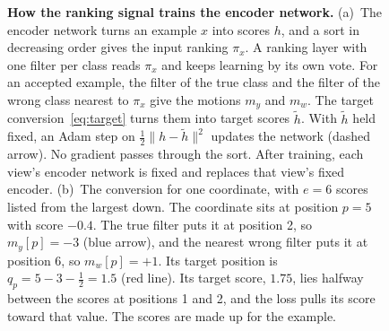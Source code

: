 \begin{figure}[!htbp]
{%
}
\caption{\textbf{How the ranking signal trains the encoder network.} (a)~The encoder network turns an example $x$ into scores $h$, and a sort in decreasing order gives the input ranking $\pi_x$. A ranking layer with one filter per class reads $\pi_x$ and keeps learning by its own vote. For an accepted example, the filter of the true class and the filter of the wrong class nearest to $\pi_x$ give the motions $m_y$ and $m_w$. The target conversion~\eqref{eq:target} turns them into target scores $\tilde h$. With $\tilde h$ held fixed, an Adam step on $\tfrac12\lVert h-\tilde h\rVert^2$ updates the network (dashed arrow). No gradient passes through the sort. After training, each view's encoder network is fixed and replaces that view's fixed encoder. (b)~The conversion for one coordinate, with $e=6$ scores listed from the largest down. The coordinate sits at position $p=5$ with score $-0.4$. The true filter puts it at position 2, so $m_y[p]=-3$ (blue arrow), and the nearest wrong filter puts it at position 6, so $m_w[p]=+1$. Its target position is $q_p=5-3-\tfrac12=1.5$ (red line). Its target score, $1.75$, lies halfway between the scores at positions 1 and 2, and the loss pulls its score toward that value. The scores are made up for the example.}
\label{fig:target}
\end{figure}
